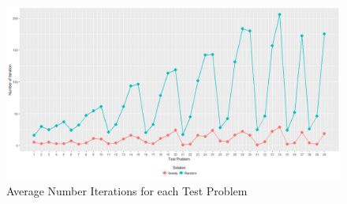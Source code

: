 \documentclass[11pt]{article}
\begin{document}
				
				\begin{figure}[H]
					\begin{center}
						\includegraphics[width=14cm]{Fintiterations.png}
						\caption{Average Number Iterations for each Test Problem}
						\label{Fintiterations}
					\end{center}
				\end{figure}
	
\end{document}
